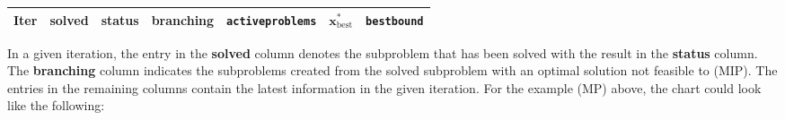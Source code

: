 \begin{longtable}[]{@{}ccccccc@{}}
\toprule
\begin{minipage}[b]{0.08\columnwidth}\centering\strut
\textbf{Iter}\strut
\end{minipage} & \begin{minipage}[b]{0.08\columnwidth}\centering\strut
\textbf{solved}\strut
\end{minipage} & \begin{minipage}[b]{0.09\columnwidth}\centering\strut
\textbf{status}\strut
\end{minipage} & \begin{minipage}[b]{0.08\columnwidth}\centering\strut
\textbf{branching}\strut
\end{minipage} & \begin{minipage}[b]{0.18\columnwidth}\centering\strut
\texttt{activeproblems}\strut
\end{minipage} & \begin{minipage}[b]{0.09\columnwidth}\centering\strut
\(\mathbf{x}^*_{\text{best}}\)\strut
\end{minipage} & \begin{minipage}[b]{0.12\columnwidth}\centering\strut
\texttt{bestbound}\strut
\end{minipage}\tabularnewline
\midrule
\endhead
\end{longtable}

In a given iteration, the entry in the \textbf{solved} column denotes
the subproblem that has been solved with the result in the
\textbf{status} column. The \textbf{branching} column indicates the
subproblems created from the solved subproblem with an optimal solution
not feasible to (MIP). The entries in the remaining columns contain the
latest information in the given iteration. For the example (MP) above,
the chart could look like the following:

